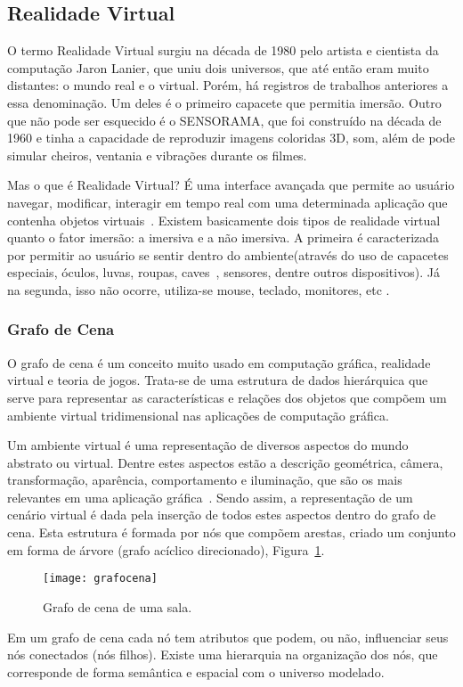\subsection{Realidade Virtual}
	O termo Realidade Virtual surgiu na década de 1980 pelo artista e cientista da computação Jaron Lanier, que uniu dois universos, que até então eram muito distantes: o mundo real e o virtual. Porém, há registros de trabalhos anteriores a essa denominação. Um deles é o primeiro capacete que permitia imersão. Outro que não pode ser esquecido é o SENSORAMA, que foi construído na década de 1960 e tinha a capacidade de reproduzir imagens coloridas 3D, som, além de pode simular cheiros, ventania e vibrações durante os filmes.

	Mas o que é Realidade Virtual? É uma interface avançada que permite ao usuário navegar, modificar, interagir em tempo real com uma determinada aplicação que contenha objetos virtuais~\cite{rv}. Existem basicamente dois tipos de realidade virtual quanto o fator imersão: a imersiva e a não imersiva. A primeira é caracterizada por permitir ao usuário se sentir dentro do ambiente(através do uso de capacetes especiais, óculos, luvas, roupas, caves~\cite{cave}, sensores, dentre outros dispositivos). Já na segunda, isso não ocorre, utiliza-se mouse, teclado, monitores, etc \cite{aect}.

\subsubsection{Grafo de Cena}
	O grafo de cena é um conceito muito usado em computação gráfica, realidade virtual e teoria de jogos. Trata-se de uma estrutura de dados hierárquica que serve para representar as características e relações dos objetos que compõem um ambiente virtual tridimensional nas aplicações de computação gráfica. 

	Um ambiente virtual é uma representação de diversos aspectos do mundo abstrato ou virtual. Dentre estes aspectos estão a descrição geométrica, câmera, transformação, aparência, comportamento e iluminação, que são os mais relevantes em uma aplicação gráfica~\cite{ferreira}. Sendo assim, a representação de um cenário virtual é dada pela inserção de todos estes aspectos dentro do grafo de cena. Esta estrutura é formada por nós que compõem arestas, criado um conjunto em forma de árvore (grafo acíclico direcionado), Figura~\ref{fg:grafocena}.
\begin{figure}[ht!]
	\centering
	\texttt{[image: grafocena]}
	\caption{Grafo de cena de uma sala.}
	\label{fg:grafocena}
\end{figure} 
	Em um grafo de cena cada nó tem atributos que podem, ou não, influenciar seus nós conectados (nós filhos). Existe uma hierarquia na organização dos nós, que corresponde de forma semântica e espacial com o universo modelado.

